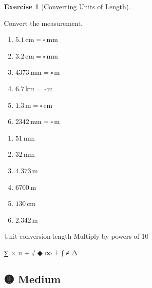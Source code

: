 \documentclass[
  letterpaper,
  DIV=11,
  numbers=noendperiod]{scrreprt}
\theoremstyle{definition}
\newtheorem{exercise}{Exercise}[chapter]
\theoremstyle{remark}
\begin{document}
\begin{exercise}[Converting Units of
Length]\protect\hypertarget{exr-conv-1}{}\label{exr-conv-1}

Convert the measurement.

\begin{enumerate}
\def\labelenumi{\alph{enumi})}
\item
  \(5.1\,\text{cm} = \square\,\text{mm}\)
\item
  \(3.2\,\text{cm} = \square\,\text{mm}\)
\item
  \(4373\,\text{mm} = \square\,\text{m}\)
\item
  \(6.7\,\text{km} = \square\,\text{m}\)
\item
  \(1.3\,\text{m} = \square\,\text{cm}\)
\item
  \(2342\,\text{mm} = \square\,\text{m}\)
\end{enumerate}

\begin{tcolorbox}[enhanced jigsaw, opacitybacktitle=0.6, coltitle=black, arc=.35mm, colframe=quarto-callout-tip-color-frame, colback=white, bottomrule=.15mm, left=2mm, colbacktitle=quarto-callout-tip-color!10!white, titlerule=0mm, opacityback=0, title=\textcolor{quarto-callout-tip-color}{\faLightbulb}\hspace{0.5em}{🔍 View Solution}, leftrule=.75mm, breakable, rightrule=.15mm, bottomtitle=1mm, toptitle=1mm, toprule=.15mm]

\begin{enumerate}
\def\labelenumi{\alph{enumi})}
\item
  \(51\,\text{mm}\)
\item
  \(32\,\text{mm}\)
\item
  \(4.373\,\text{m}\)
\item
  \(6700\,\text{m}\)
\item
  \(130\,\text{cm}\)
\item
  \(2.342\,\text{m}\)
\end{enumerate}

\end{tcolorbox}

{Unit conversion length} {Multiply by powers of 10}

\end{exercise}

∑ × π ÷ √ ◆ ∞ ± ∫ ≠ Δ

\subsection{🟡 Medium}
\end{document}
